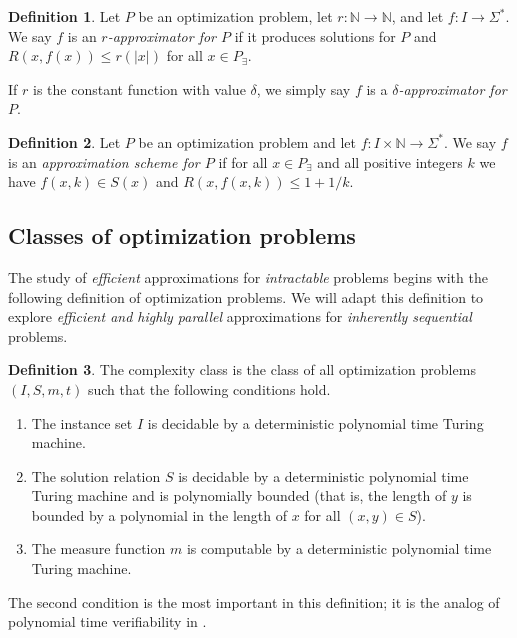 \documentclass[]{article}
\theoremstyle{definition} \newtheorem{definition}{Definition}
\theoremstyle{definition} \newtheorem{openquestion}{Open question}
\begin{document}
\begin{definition}
  Let $P$ be an optimization problem, let $r\colon \mathbb{N}\to\mathbb{N}$, and let $f\colon I\to \Sigma^*$.
  We say $f$ is an \emph{$r$-approximator for $P$} if it produces solutions for $P$ and $R(x, f(x)) \leq r(|x|)$ for all $x\in P_\exists$.

  If $r$ is the constant function with value $\delta$, we simply say $f$ is a \emph{$\delta$-approximator for $P$}.
\end{definition}

\begin{definition}
  Let $P$ be an optimization problem and let $f\colon I\times\mathbb{N}\to\Sigma^*$.
  We say $f$ is an \emph{approximation scheme for $P$} if for all $x\in P_\exists$ and all positive integers $k$ we have $f(x, k)\in S(x)$ and $R(x, f(x, k)) \leq 1 + 1 / k$.
\end{definition}

\subsection{Classes of optimization problems}

The study of \emph{efficient} approximations for \emph{intractable} problems begins with the following definition of \NP{} optimization problems.
We will adapt this definition to explore \emph{efficient and highly parallel} approximations for \emph{inherently sequential} problems.

\begin{definition}\label{def:npo}
  The complexity class \NPO{} is the class of all optimization problems $(I, S, m, t)$ such that the following conditions hold.
  \begin{enumerate}
  \item The instance set $I$ is decidable by a deterministic polynomial time Turing machine.
  \item The solution relation $S$ is decidable by a deterministic polynomial time Turing machine and is polynomially bounded (that is, the length of $y$ is bounded by a polynomial in the length of $x$ for all $(x, y)\in S$).
  \item The measure function $m$ is computable by a deterministic polynomial time Turing machine.
  \end{enumerate}
\end{definition}

The second condition is the most important in this definition; it is the analog of polynomial time verifiability in \NP.
\end{document}
